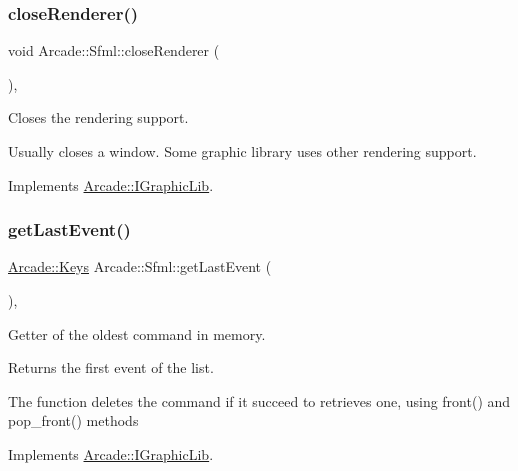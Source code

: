 \subsubsection{\texorpdfstring{close\+Renderer()}{closeRenderer()}}
{\footnotesize\ttfamily void Arcade\+::\+Sfml\+::close\+Renderer (\begin{DoxyParamCaption}{ }\end{DoxyParamCaption})\hspace{0.3cm}{\ttfamily [final]}, {\ttfamily [virtual]}}



Closes the rendering support. 

Usually closes a window. Some graphic library uses other rendering support. 

Implements \hyperlink{class_arcade_1_1_i_graphic_lib_aa7c3c8b922fbc94f5e74ecfebad52742}{Arcade\+::\+I\+Graphic\+Lib}.

\mbox{\label{class_arcade_1_1_sfml_aa31ab4c4729ee0e3ff030989bc38237b}} 
\subsubsection{\texorpdfstring{get\+Last\+Event()}{getLastEvent()}}
{\footnotesize\ttfamily \hyperlink{namespace_arcade_a9b501908b20bc993e4f8226db5323c41}{Arcade\+::\+Keys} Arcade\+::\+Sfml\+::get\+Last\+Event (\begin{DoxyParamCaption}{ }\end{DoxyParamCaption})\hspace{0.3cm}{\ttfamily [final]}, {\ttfamily [virtual]}}



Getter of the oldest command in memory. 

\begin{DoxyReturn}{Returns}
the first event of the list.
\end{DoxyReturn}
The function deletes the command if it succeed to retrieves one, using front() and pop\+\_\+front() methods 

Implements \hyperlink{class_arcade_1_1_i_graphic_lib_a801ebd3cff2c861e4b2a1e664c123da7}{Arcade\+::\+I\+Graphic\+Lib}.

\mbox{\label{class_arcade_1_1_sfml_a220fc84bb5728f79e36024fded0103ab}} 

